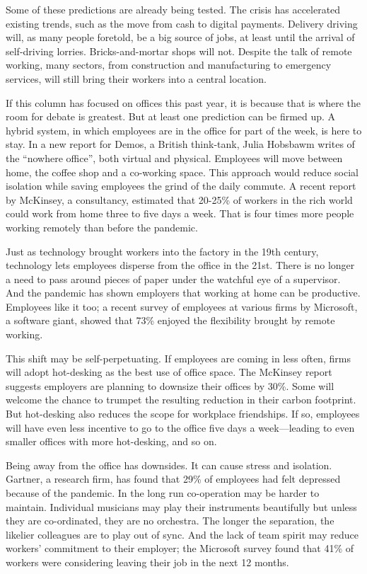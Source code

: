 \documentclass{article}
\begin{document}
Some of these predictions are already being tested. The crisis has accelerated existing trends, such as the move from cash to digital payments. Delivery driving will, as many people foretold, be a big source of jobs, at least until the arrival of self-driving lorries. Bricks-and-mortar shops will not. Despite the talk of remote working, many sectors, from construction and manufacturing to emergency services, will still bring their workers into a central location. 

If this column has focused on offices this past year, it is because that is where the room for debate is greatest. But at least one prediction can be firmed up. A hybrid system, in which employees are in the office for part of the week, is here to stay. In a new report for Demos, a British think-tank, Julia Hobsbawm writes of the ``nowhere office'', both virtual and physical. Employees will move between home, the coffee shop and a co-working space. This approach would reduce social isolation while saving employees the grind of the daily commute. A recent report by McKinsey, a consultancy, estimated that 20-25\% of workers in the rich world could work from home three to five days a week. That is four times more people working remotely than before the pandemic. 

Just as technology brought workers into the factory in the 19th century, technology lets employees disperse from the office in the 21st. There is no longer a need to pass around pieces of paper under the watchful eye of a supervisor. And the pandemic has shown employers that working at home can be productive. Employees like it too; a recent survey of employees at various firms by Microsoft, a software giant, showed that 73\% enjoyed the flexibility brought by remote working. 

This shift may be self-perpetuating. If employees are coming in less often, firms will adopt hot-desking as the best use of office space. The McKinsey report suggests employers are planning to downsize their offices by 30\%. Some will welcome the chance to trumpet the resulting reduction in their carbon footprint. But hot-desking also reduces the scope for workplace friendships. If so, employees will have even less incentive to go to the office five days a week---leading to even smaller offices with more hot-desking, and so on. 

Being away from the office has downsides. It can cause stress and isolation. Gartner, a research firm, has found that 29\% of employees had felt depressed because of the pandemic. In the long run co-operation may be harder to maintain. Individual musicians may play their instruments beautifully but unless they are co-ordinated, they are no orchestra. The longer the separation, the likelier colleagues are to play out of sync. And the lack of team spirit may reduce workers' commitment to their employer; the Microsoft survey found that 41\% of workers were considering leaving their job in the next 12 months. 
\end{document}
